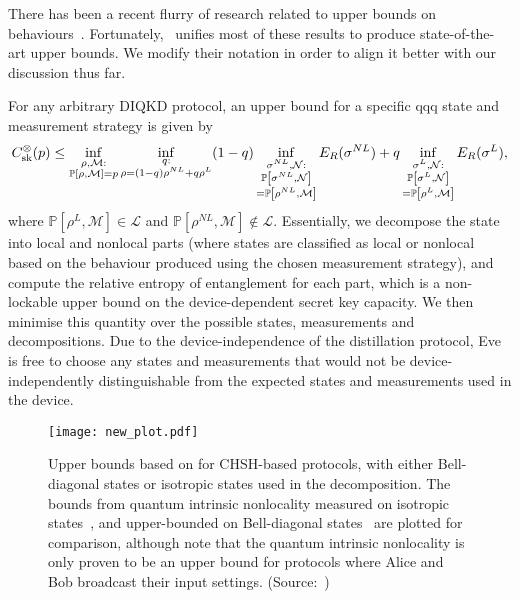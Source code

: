 \documentclass[10pt, a4paper]{article}
\numberwithin{equation}{section} %
\theoremstyle{definition}
\theoremstyle{plain}
\newcommand{\?}{\mathrel{?}} %
\newcommand{\sM}{\mathcal{M}}
\newcommand{\sN}{\mathcal{N}}
\newcommand{\Ls}{\mathcal{L}}
\newcommand{\behav}[2]{\mathbb{P}\left[#1, #2\right]}
\newcommand{\sk}{\rm sk}
\begin{document}
    There has been a recent flurry of research related to upper bounds on behaviours~\cite{NotSufficient, RevisedPeres, DIQKD_QKD_Gap, CCSquashedEntangle, DIQKD_Limits}. Fortunately,~\cite{CCSquashedEntangle} unifies most of these results to produce state-of-the-art upper bounds. We modify their notation in order to align it better with our discussion thus far.

    For any arbitrary DIQKD protocol, an upper bound for a specific qqq state and measurement strategy is given by~\cite[Thm 3]{CCSquashedEntangle}
    \begin{equation}\label{eqn:genubound_state}
      C^{\otimes}_{\sk}(p) \leq \inf_{\substack{\rho,\sM : \\ \behav{\rho}{ \sM} = p}} \inf_{\substack{q : \\ \rho = (1-q)\rho^{NL} + q\rho^L}} (1-q) \inf_{\substack{\sigma^{NL}, \sN : \\ \behav{\sigma^{NL}}{ \sN} \\ = \behav{\rho^{NL}}{ \sM} }} E_R(\sigma^{NL}) + q \inf_{\substack{\sigma^L, \sN : \\ \behav{\sigma^L}{ \sN} \\ = \behav{\rho^L}{ \sM} }} E_R(\sigma^L),
    \end{equation}
    where \(\behav{\rho^L}{ \sM} \in \Ls\) and \(\behav{\rho^{NL}}{ \sM} \not\in \Ls\). Essentially, we decompose the state into local and nonlocal parts (where states are classified as local or nonlocal based on the behaviour produced using the chosen measurement strategy), and compute the relative entropy of entanglement for each part, which is a non-lockable upper bound on the device-dependent secret key capacity. We then minimise this quantity over the possible states, measurements and decompositions. Due to the device-independence of the distillation protocol, Eve is free to choose any states and measurements that would not be device-independently distinguishable from the expected states and measurements used in the device.

    \begin{figure}
      \centering
      \texttt{[image: new\_plot.pdf]}
      \caption[Comparison of upper bounds for CHSH-based protocols.]{\label{fig:genubound} Upper bounds based on  for CHSH-based protocols, with either Bell-diagonal states or isotropic states used in the decomposition. The bounds from quantum intrinsic nonlocality measured on isotropic states~\cite{DIQKD_Limits}, and upper-bounded on Bell-diagonal states~\cite[Appendix B]{RevisedPeres} are plotted for comparison, although note that the quantum intrinsic nonlocality is only proven to be an upper bound for protocols where Alice and Bob broadcast their input settings. (Source:~\cite{CCSquashedEntangle})}
    \end{figure}
\end{document}

